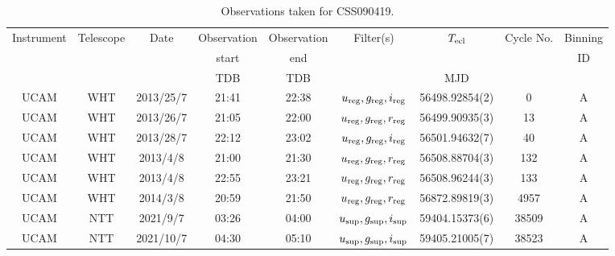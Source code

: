 \begin{table}
	\begin{center}
		\caption{Observations taken for CSS090419.}
		\label{table:observing:observation logs CSS090419}
		\begin{tabular}{ccccccccc}
			\hline
			Instrument & Telescope & Date & Observation  & Observation  & Filter(s) & $T_{\rm ecl}$ & Cycle No. & Binning \\
			 &  &  &  start &  end &  &  &  & ID \\
			 &  &  & TDB & TDB &  & MJD &  &  \\
			\hline
			\hline
			UCAM & WHT & 2013/25/7 & 21:41 & 22:38 & $u_{\rm reg},g_{\rm reg},i_{\rm reg}$ & 56498.92854(2) &    0  & A \\
			UCAM & WHT & 2013/26/7 & 21:05 & 22:00 & $u_{\rm reg},g_{\rm reg},r_{\rm reg}$ & 56499.90935(3) &   13  & A \\
			UCAM & WHT & 2013/28/7 & 22:12 & 23:02 & $u_{\rm reg},g_{\rm reg},i_{\rm reg}$ & 56501.94632(7) &   40  & A \\
			UCAM & WHT & 2013/4/8  & 21:00 & 21:30 & $u_{\rm reg},g_{\rm reg},r_{\rm reg}$ & 56508.88704(3) &  132  & A \\
			UCAM & WHT & 2013/4/8  & 22:55 & 23:21 & $u_{\rm reg},g_{\rm reg},r_{\rm reg}$ & 56508.96244(3) &  133  & A \\
			UCAM & WHT & 2014/3/8  & 20:59 & 21:50 & $u_{\rm reg},g_{\rm reg},r_{\rm reg}$ & 56872.89819(3) & 4957  & A \\
			UCAM & NTT & 2021/9/7  & 03:26 & 04:00 & $u_{\rm sup},g_{\rm sup},i_{\rm sup}$ & 59404.15373(6) & 38509 & A \\
			UCAM & NTT & 2021/10/7 & 04:30 & 05:10 & $u_{\rm sup},g_{\rm sup},i_{\rm sup}$ & 59405.21005(7) & 38523 & A \\
		   \hline
		\end{tabular}
	\end{center}
\end{table}